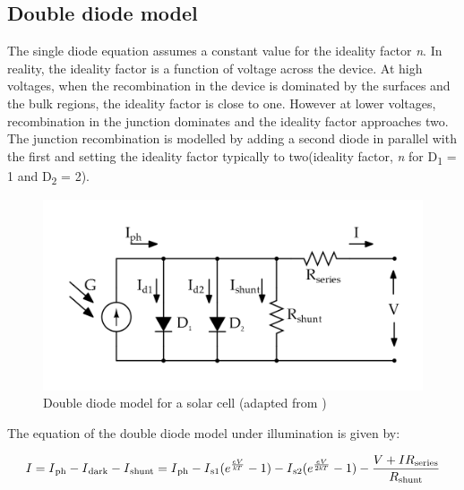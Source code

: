 \subsection{Double diode model}\label{sec:DDM}

The single diode equation assumes a constant value for the ideality factor \textit{n}. In reality, the ideality factor is a function of voltage across the device. At high voltages, when the recombination in the device is dominated by the surfaces and the bulk regions, the ideality factor is close to one. However at lower voltages, recombination in the junction dominates and the ideality factor approaches two. The junction recombination is modelled by adding a second diode in parallel with the first and setting the ideality factor typically to two(ideality factor, \textit{n} for D\textsubscript{1} = 1 and D\textsubscript{2} = 2)\cite{pv_education_org}.\\

 \begin{figure}[H]
  \begin{center}
  \includegraphics[width=\textwidth]{images/Double_diode_model}
  \caption{ Double diode model for a solar cell (adapted from \cite{pv_education_org}) }
  \label{fig:Double_EQu_cell}
  \end{center}
  \end{figure}
  
The equation of the double diode model under illumination is given by:  

  \begin{equation}
   \begin{aligned}
    I = I\textsubscript{ph} - I\textsubscript{dark} - I\textsubscript{shunt} = I\textsubscript{ph} -  I\textsubscript{s1} (e^{\frac{eV}{\textit{k}T}}-1) - I\textsubscript{s2} (e^{\frac{eV}{2\textit{k}T}}-1)- \dfrac{V+IR\textsubscript{series}}{R\textsubscript{shunt}}
     \label{eq:equ_current_double}
    \end{aligned}
    \end{equation}
  
